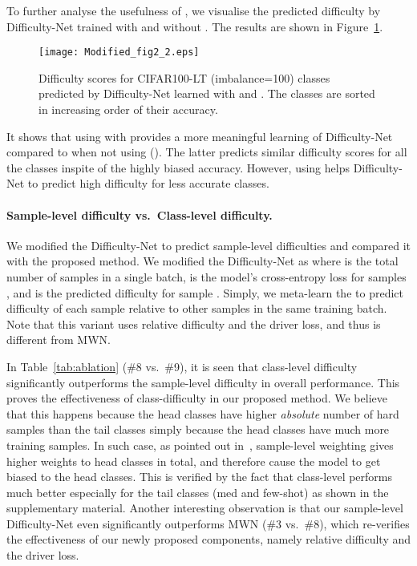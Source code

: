 \documentclass[10pt,twocolumn,letterpaper]{article}
\begin{document}
 To further analyse the usefulness of , we visualise the predicted difficulty by Difficulty-Net trained with and without . The results are shown in Figure~\ref{fig:difficulty-net}. 
 \begin{figure}[t]
\begin{center}
    \texttt{[image: Modified\_fig2\_2.eps]}
\end{center}
\caption{Difficulty scores for CIFAR100-LT (imbalance=100) classes predicted by Difficulty-Net learned with  and . The classes are sorted in increasing order of their accuracy. }
\label{fig:difficulty-net}
\end{figure}
It shows that using  with  provides a more meaningful learning of Difficulty-Net compared to when not using  ().
The latter predicts similar difficulty scores for all the classes inspite of the highly biased accuracy. 
However, using  helps Difficulty-Net to predict high difficulty for less accurate classes. 


\vspace{-8pt}
\paragraph{\bf Sample-level difficulty vs.~Class-level difficulty.}
We modified the Difficulty-Net to predict sample-level difficulties and compared it with the proposed method.
We modified the Difficulty-Net as  where  is the total number of samples in a single batch,  is the model's cross-entropy loss for samples , and  is the predicted difficulty for sample . 
Simply, we meta-learn the  to predict difficulty of each sample relative to other samples in the same training batch.
Note that this variant uses relative difficulty and the driver loss, and thus is different from MWN.


In Table~\ref{tab:ablation} (\#8 vs.~\#9), it is seen that class-level difficulty significantly outperforms the sample-level difficulty in overall performance. This proves the effectiveness of class-difficulty in our proposed method. 
We believe that this happens because the head classes have higher {\it absolute} number of hard samples than the tail classes simply because the head classes have much more training samples. 
In such case, as pointed out in~\cite{cdb-ce}, sample-level weighting gives higher weights to head classes in total, and therefore cause the model to get biased to the head classes. 
This is verified by the fact that class-level performs much better especially for the tail classes (med and few-shot) as shown in the supplementary material. 
Another interesting observation is that our sample-level Difficulty-Net even significantly outperforms MWN (\#3 vs.~\#8), which re-verifies the effectiveness of our newly proposed components, namely relative difficulty and the driver loss.
\end{document}

